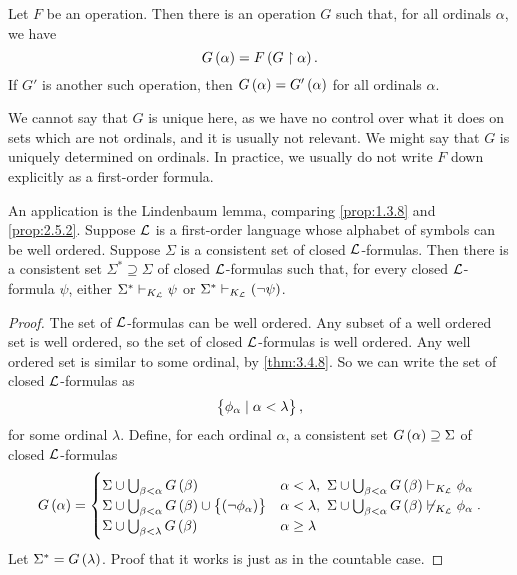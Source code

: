 \begin{theorem}
\label{thm:3.6.1}
Let $ F $ be an operation. Then there is an operation $ G $ such that, for all ordinals $ \alpha $, we have
$$ G\br{\alpha} = F\br{G \upharpoonright \alpha}. $$
If $ G' $ is another such operation, then $ G\br{\alpha} = G'\br{\alpha} $ for all ordinals $ \alpha $.
\end{theorem}

We cannot say that $ G $ is unique here, as we have no control over what it does on sets which are not ordinals, and it is usually not relevant. We might say that $ G $ is uniquely determined on ordinals. In practice, we usually do not write $ F $ down explicitly as a first-order formula.

\begin{remark}
An application is the Lindenbaum lemma, comparing \ref{prop:1.3.8} and \ref{prop:2.5.2}. Suppose $ \mathcal{L} $ is a first-order language whose alphabet of symbols can be well ordered. Suppose $ \Sigma $ is a consistent set of closed $ \mathcal{L} $-formulas. Then there is a consistent set $ \Sigma^* \supseteq \Sigma $ of closed $ \mathcal{L} $-formulas such that, for every closed $ \mathcal{L} $-formula $ \psi $, either $ \Sigma^* \vdash_{K_{\mathcal{L}}} \psi $ or $ \Sigma^* \vdash_{K_\LL} \notb{\psi} $.
\end{remark}

\begin{proof}
The set of $ \mathcal{L} $-formulas can be well ordered. Any subset of a well ordered set is well ordered, so the set of closed $ \mathcal{L} $-formulas is well ordered. Any well ordered set is similar to some ordinal, by \ref{thm:3.4.8}. So we can write the set of closed $ \mathcal{L} $-formulas as
$$ \cbr{\phi_\alpha \mid \alpha < \lambda}, $$
for some ordinal $ \lambda $. Define, for each ordinal $ \alpha $, a consistent set $ G\br{\alpha} \supseteq \Sigma $ of closed $ \mathcal{L} $-formulas
$$ G\br{\alpha} =
\begin{cases}
\Sigma \cup \bigcup_{\beta < \alpha} G\br{\beta} & \alpha < \lambda, \ \Sigma \cup \bigcup_{\beta < \alpha} G\br{\beta} \vdash_{K_\LL} \phi_\alpha \\
\Sigma \cup \bigcup_{\beta < \alpha} G\br{\beta} \cup \cbr{\notb{\phi_\alpha}} & \alpha < \lambda, \ \Sigma \cup \bigcup_{\beta < \alpha} G\br{\beta} \not\vdash_{K_\LL} \phi_\alpha \\
\Sigma \cup \bigcup_{\beta < \lambda} G\br{\beta} & \alpha \ge \lambda
\end{cases}.
$$
Let $ \Sigma^* = G\br{\lambda} $. Proof that it works is just as in the countable case.
\end{proof}

